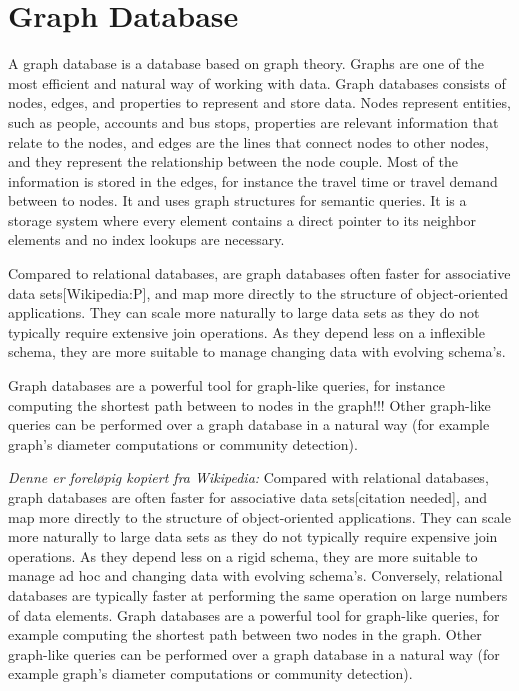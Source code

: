 \section{Graph Database}


A graph database is a database based on graph theory. Graphs are one of the most efficient and natural way of working with data. Graph databases consists of nodes, edges, and properties to represent and store data. Nodes represent entities, such as people, accounts and bus stops, properties are relevant information that relate to the nodes, and edges are the lines that connect nodes to other nodes, and they represent the relationship between the node couple. Most of the information is stored in the edges, for instance the travel time or travel demand between to nodes. It and uses graph structures for semantic queries. It is a storage system where every element contains a direct pointer to its neighbor elements and no index lookups are necessary. 

\par %
Compared to relational databases, are graph databases often faster for associative data sets[Wikipedia:P], and map more directly to the structure of object-oriented applications. They can scale more naturally to large data sets as they do not typically require extensive join operations. As they depend less on a inflexible schema, they are more suitable to manage changing data with evolving schema's. 

\par
Graph databases are a powerful tool for graph-like queries, for instance computing the shortest path between to nodes in the graph!!! Other graph-like queries can be performed over a graph database in a natural way (for example graph's diameter computations or community detection).

\par

\textit{Denne er foreløpig kopiert fra Wikipedia: }%
Compared with relational databases, graph databases are often faster for associative data sets[citation needed], and map more directly to the structure of object-oriented applications. They can scale more naturally to large data sets as they do not typically require expensive join operations. As they depend less on a rigid schema, they are more suitable to manage ad hoc and changing data with evolving schema's. Conversely, relational databases are typically faster at performing the same operation on large numbers of data elements.
Graph databases are a powerful tool for graph-like queries, for example computing the shortest path between two nodes in the graph. Other graph-like queries can be performed over a graph database in a natural way (for example graph's diameter computations or community detection).

